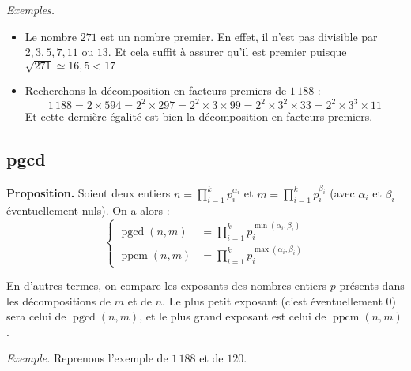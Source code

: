 \documentclass[11pt,class=report,crop=false]{standalone}
\newcommand{\pgcd}{\mathop{\mathrm{pgcd}}\nolimits}
\newcommand{\ppcm}{\mathop{\mathrm{ppcm}}\nolimits}
\begin{document}
\emph{Exemples.}
\begin{itemize}
    \item Le nombre $271$ est un nombre premier. En effet, il n'est pas divisible par $2, 3, 5, 7, 11$ ou $13$. Et cela suffit à assurer qu'il est premier puisque $\sqrt{271}\simeq16,5<17$
    
    \item Recherchons la décomposition en facteurs premiers de $1\,188$ :
    $$1\,188=2\times594=2^2\times297=2^2\times3\times99=
    2^2\times3^2\times33=2^2\times3^3\times11$$
    Et cette dernière égalité est bien la décomposition en facteurs premiers.
\end{itemize}


\subsection*{pgcd}

\textbf{Proposition.}
Soient deux entiers $n=\prod_{i=1}^k p_i^{\alpha_i}$ et $m=\prod_{i=1}^k p_i^{\beta_i}$ (avec $\alpha_i$ et $\beta_i$ éventuellement nuls). On a alors :
$$ \begin{cases} 
\pgcd(n,m) & = \prod_{i=1}^k p_i^{\min(\alpha_i,\beta_i)} \\ 
\ppcm(n,m) & = \prod_{i=1}^k p_i^{\max(\alpha_i,\beta_i)} 
\end{cases}$$

En d'autres termes, on compare les exposants des nombres entiers $p$ présents dans les décompositions de $m$ et de $n$. Le plus petit exposant (c'est éventuellement $0$) sera celui de $\pgcd(n,m)$, et le plus grand exposant est celui de $\ppcm(n,m)$.

\bigskip

\emph{Exemple.}
Reprenons l'exemple de $1\,188$ et de $120$. 
\end{document}
